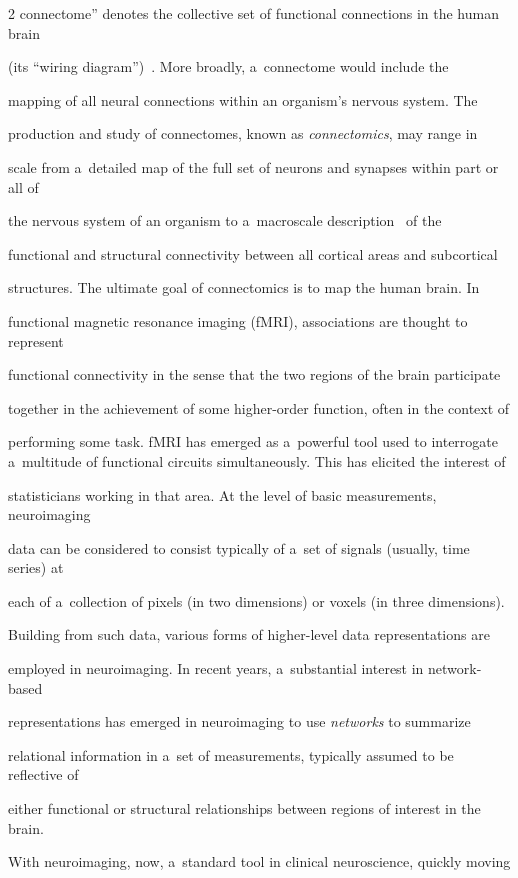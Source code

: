\begin{multicols}{2}
connectome'' denotes the collective set of functional connections in the human brain


(its ``wiring diagram'')~\cite{62-kl}. More broadly, a~connectome would include the


mapping of all neural connections within an organism's nervous system. The


production and study of connectomes, known as \textit{connectomics}, may range in


scale from a~detailed map of the full set of neurons and synapses within part or all of


the nervous system of an organism to a~macroscale description~\cite{63-kl} of the


functional and structural connectivity between all cortical areas and subcortical


structures. The ultimate goal of connectomics is to map the human brain. In


functional magnetic resonance imaging (fMRI), associations are thought to represent


functional connectivity in the sense that the two regions of the brain participate


together in the achievement of some higher-order function, often in the context of


performing some task. fMRI has emerged as a~powerful tool used to interrogate a~multitude of functional circuits simultaneously. This has elicited the interest of


statisticians working in that area. At the level of basic measurements, neuroimaging


data can be considered to consist typically of a~set of signals (usually, time series) at


each of a~collection of pixels (in two dimensions) or voxels (in three dimensions).


Building from such data, various forms of higher-level data representations are


employed in neuroimaging. In recent years, a~substantial interest in network-based


representations has emerged in neuroimaging to use \textit{networks} to summarize


relational information in a~set of measurements, typically assumed to be reflective of


either functional or structural relationships between regions of interest in the brain.


With neuroimaging, now, a~standard tool in clinical neuroscience, quickly moving



\end{multicols}
